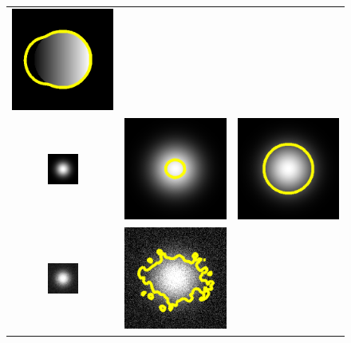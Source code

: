 \begin{figure}[htb]
\begin{tabular}{@{}ccc@{}}
\includegraphics[height=0.3\textwidth]{images/demo/GACvsCV/CV_inhom}	\\
\includegraphics[width=0.3\textwidth]{images/demo/GACvsCV/gauss}	&
\includegraphics[height=0.3\textwidth]{images/demo/GACvsCV/GAC_gauss}	&
\includegraphics[height=0.3\textwidth]{images/demo/GACvsCV/CV_gauss}	\\
\includegraphics[width=0.3\textwidth]{images/demo/GACvsCV/gauss_noisy}	&
\includegraphics[height=0.3\textwidth]{images/demo/GACvsCV/GAC_gauss_noisy}	&

\end{tabular}
\end{figure}
